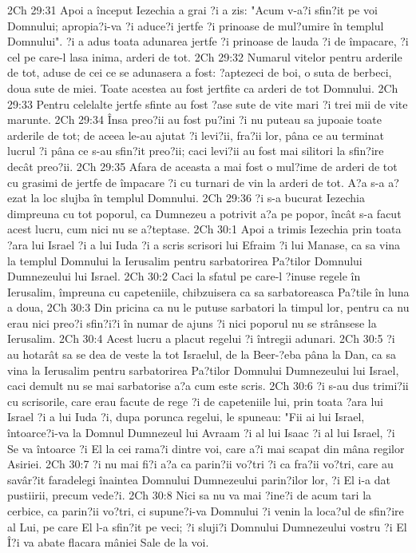 2Ch 29:31  Apoi a început Iezechia a grai ?i a zis: "Acum v-a?i sfin?it pe voi Domnului; apropia?i-va ?i aduce?i jertfe ?i prinoase de mul?umire în templul Domnului". ?i a adus toata adunarea jertfe ?i prinoase de lauda ?i de împacare, ?i cel pe care-l lasa inima, arderi de tot.
2Ch 29:32  Numarul vitelor pentru arderile de tot, aduse de cei ce se adunasera a fost: ?aptezeci de boi, o suta de berbeci, doua sute de miei. Toate acestea au fost jertfite ca arderi de tot Domnului.
2Ch 29:33  Pentru celelalte jertfe sfinte au fost ?ase sute de vite mari ?i trei mii de vite marunte.
2Ch 29:34  Însa preo?ii au fost pu?ini ?i nu puteau sa jupoaie toate arderile de tot; de aceea le-au ajutat ?i levi?ii, fra?ii lor, pâna ce au terminat lucrul ?i pâna ce s-au sfin?it preo?ii; caci levi?ii au fost mai silitori la sfin?ire decât preo?ii.
2Ch 29:35  Afara de aceasta a mai fost o mul?ime de arderi de tot cu grasimi de jertfe de împacare ?i cu turnari de vin la arderi de tot. A?a s-a a?ezat la loc slujba în templul Domnului.
2Ch 29:36  ?i s-a bucurat Iezechia dimpreuna cu tot poporul, ca Dumnezeu a potrivit a?a pe popor, încât s-a facut acest lucru, cum nici nu se a?teptase.
2Ch 30:1  Apoi a trimis Iezechia prin toata ?ara lui Israel ?i a lui Iuda ?i a scris scrisori lui Efraim ?i lui Manase, ca sa vina la templul Domnului la Ierusalim pentru sarbatorirea Pa?tilor Domnului Dumnezeului lui Israel.
2Ch 30:2  Caci la sfatul pe care-l ?inuse regele în Ierusalim, împreuna cu capeteniile, chibzuisera ca sa sarbatoreasca Pa?tile în luna a doua,
2Ch 30:3  Din pricina ca nu le putuse sarbatori la timpul lor, pentru ca nu erau nici preo?i sfin?i?i în numar de ajuns ?i nici poporul nu se strânsese la Ierusalim.
2Ch 30:4  Acest lucru a placut regelui ?i întregii adunari.
2Ch 30:5  ?i au hotarât sa se dea de veste la tot Israelul, de la Beer-?eba pâna la Dan, ca sa vina la Ierusalim pentru sarbatorirea Pa?tilor Domnului Dumnezeului lui Israel, caci demult nu se mai sarbatorise a?a cum este scris.
2Ch 30:6  ?i s-au dus trimi?ii cu scrisorile, care erau facute de rege ?i de capeteniile lui, prin toata ?ara lui Israel ?i a lui Iuda ?i, dupa porunca regelui, le spuneau: "Fii ai lui Israel, întoarce?i-va la Domnul Dumnezeul lui Avraam ?i al lui Isaac ?i al lui Israel, ?i Se va întoarce ?i El la cei rama?i dintre voi, care a?i mai scapat din mâna regilor Asiriei.
2Ch 30:7  ?i nu mai fi?i a?a ca parin?ii vo?tri ?i ca fra?ii vo?tri, care au savâr?it faradelegi înaintea Domnului Dumnezeului parin?ilor lor, ?i El i-a dat pustiirii, precum vede?i.
2Ch 30:8  Nici sa nu va mai ?ine?i de acum tari la cerbice, ca parin?ii vo?tri, ci supune?i-va Domnului ?i venin la loca?ul de sfin?ire al Lui, pe care El l-a sfin?it pe veci; ?i sluji?i Domnului Dumnezeului vostru ?i El Î?i va abate flacara mâniei Sale de la voi.
